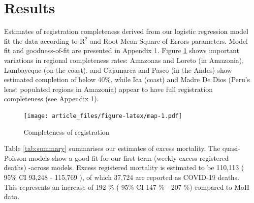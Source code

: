 \documentclass[
]{article}
\begin{document}
\hypertarget{results}{%
\section{Results}\label{results}}

Estimates of registration completeness derived from our logistic regression model fit the data according to \(\text{R}^2\) and Root Mean Square of Errors parameters. Model fit and goodness-of-fit are presented in Appendix 1. Figure \ref{fig:map} shows important variations in regional completeness rates: Amazonas and Loreto (in Amazonia), Lambayeque (on the coast), and Cajamarca and Pasco (in the Andes) show estimated completion of below 40\%, while Ica (coast) and Madre De Dios (Peru's least populated regions in Amazonia) appear to have full registration completeness (see Appendix 1).

\begin{figure}
\centering
\texttt{[image: article\_files/figure-latex/map-1.pdf]}
\caption{\label{fig:map}Completeness of registration}
\end{figure}

Table \ref{tab:summary} summarises our estimates of excess mortality. The quasi-Poisson models show a good fit for our first term (weekly excess registered deaths) -across models. Excess registered mortality is estimated to be 110,113 ( 95\% CI 93,248 - 115,769 ), of which 37,724 are reported as COVID-19 deaths. This represents an increase of 192 \% ( 95\% CI 147 \% - 207 \%) compared to MoH data.
\end{document}

